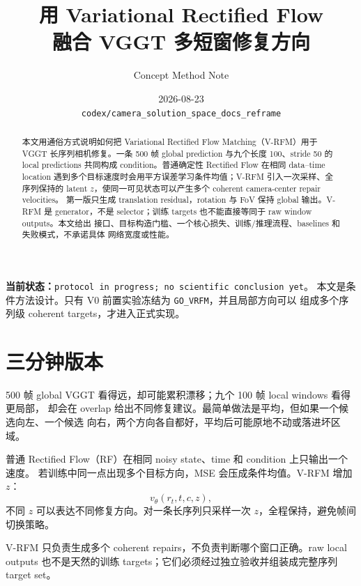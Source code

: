 \documentclass[UTF8,a4paper,11pt]{ctexart}
\title{\bfseries\color{GlobalBlue}用 Variational Rectified Flow\\
融合 VGGT 多短窗修复方向}
\author{Concept Method Note}
\date{2026-08-23\\[0.25em]
\texttt{codex/camera\_solution\_space\_docs\_reframe}}
\begin{document}
\maketitle

\begin{statusbox}
\textbf{当前状态：}\texttt{protocol in progress; no scientific conclusion yet}。
本文是条件方法设计。只有 V0 前置实验冻结为 \texttt{GO\_VRFM}，并且局部方向可以
组成多个序列级 coherent targets，才进入正式实现。
\end{statusbox}

\begin{abstract}
本文用通俗方式说明如何把 Variational Rectified Flow Matching（V-RFM）用于 VGGT
长序列相机修复。一条 500 帧 global prediction 与九个长度 100、stride 50 的 local
predictions 共同构成 condition。普通确定性 Rectified Flow 在相同 data--time location
遇到多个目标速度时会用平方误差学习条件均值；V-RFM 引入一次采样、全序列保持的
latent $z$，使同一可见状态可以产生多个 coherent camera-center repair velocities。
第一版只生成 translation residual，rotation 与 FoV 保持 global 输出。V-RFM 是
generator，不是 selector；训练 targets 也不能直接等同于 raw window outputs。本文给出
接口、目标构造门槛、一个核心损失、训练/推理流程、baselines 和失败模式，不承诺具体
网络宽度或性能。
\end{abstract}

\tableofcontents

\section{三分钟版本}

500 帧 global VGGT 看得远，却可能累积漂移；九个 100 帧 local windows 看得更局部，
却会在 overlap 给出不同修复建议。最简单做法是平均，但如果一个候选向左、一个候选
向右，两个方向各自都好，平均后可能原地不动或落进坏区域。

普通 Rectified Flow（RF）在相同 noisy state、time 和 condition 上只输出一个速度。
若训练中同一点出现多个目标方向，MSE 会压成条件均值。V-RFM 增加 $z$：
\begin{equation}
  v_\theta(r_t,t,c,z),
\end{equation}
不同 $z$ 可以表达不同修复方向。对一条长序列只采样一次 $z$，全程保持，避免帧间
切换策略。

\begin{warningbox}
V-RFM 只负责生成多个 coherent repairs，不负责判断哪个窗口正确。raw local outputs
也不是天然的训练 targets；它们必须经过独立验收并组装成完整序列 target set。
\end{warningbox}
\end{document}
